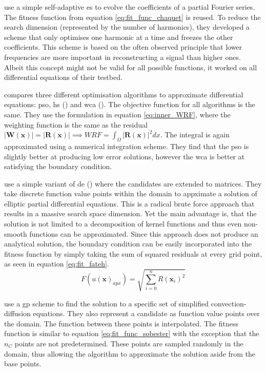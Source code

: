 \documentclass[./\jobname.tex,hidelinks]{subfiles}
\begin{document}
\cite{chaquet_solving_2012} use a simple self-adaptive \gls{es} to evolve the coefficients of a partial Fourier series. The fitness function from equation \ref{eq:fit_func_chaquet} is reused. To reduce the search dimension (represented by the number of harmonics), they developed a scheme that only optimises one harmonic at a time and freezes the other coefficients. This scheme is based on the often observed principle that lower frequencies are more important in reconstructing a signal than higher ones. Albeit this concept might not be valid for all possible functions, it worked on all differential equations of their testbed. 

\cite{sadollah_metaheuristic_2017} compares three different optimisation algorithms to approximate differential equations: \gls{pso}, \gls{hs} (\cite{geem_new_2001}) and \gls{wca} (\cite{eskandar_water_2012}). The objective function for all algorithms is the same. They use the formulation in equation \ref{eq:inner_WRF}, where the weighting function is the same as the residual $|\mathbf{W}(\mathbf{x})| = |\mathbf{R}(\mathbf{x})| \implies WRF = \int_{\Omega} |\mathbf{R}(\mathbf{x})|^2 dx$. The integral is again approximated using a numerical integration scheme. They find that the \gls{pso} is slightly better at producing low error solutions, however the \gls{wca} is better at satisfying the boundary condition. 

\cite{fateh_differential_2019} use a simple variant of \gls{de} (\cite{storn_differential_1997}) where the candidates are extended to matrices. They take discrete function value points within the domain to appximate a solution of elliptic partial differential equations. This is a radical brute force approach that results in a massive search space dimension. Yet the main advantage is, that the solution is not limited to a decomposition of kernel functions and thus even non-smooth functions can be approximated. Since this approach does not produce an analytical solution, the boundary condition can be easily incorporated into the fitness function by simply taking the sum of squared residuals at every grid point, as seen in equation \ref{eq:fit_fateh}.
\begin{equation}
\label{eq:fit_fateh}
F(u(\mathbf{x})_{apx}) = \sqrt{\sum_{i=0}^{n} R(\mathbf{x}_i)^2}
\end{equation}

\cite{howard_genetic_2011} use a \gls{gp} scheme to find the solution to a specific set of simplified convection-diffusion equations. They also represent a candidate as function value points over the domain. The function between these points is interpolated. The fitness function is similar to equation \ref{eq:fit_func_sobester} with the exception that the $n_C$ points are not predetermined. These points are sampled randomly in the domain, thus allowing the algorithm to approximate the solution aside from the base points. 
\end{document}
